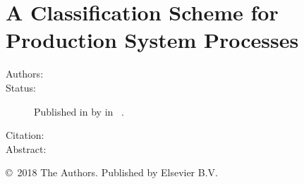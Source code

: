 \chapter{A Classification Scheme for Production System Processes}\label{paper:CMS2018}
\setcounter{page}{77}

\begin{description}
  \item[Authors:]
  \item[Status:] Published in \citeyear{SorensenCMS2018} by  in ~.
  \item[Citation:]
  \item[Abstract:] 
\end{description}

\vfill
\noindent\copyright~2018 The Authors. Published by Elsevier B.V.

% 